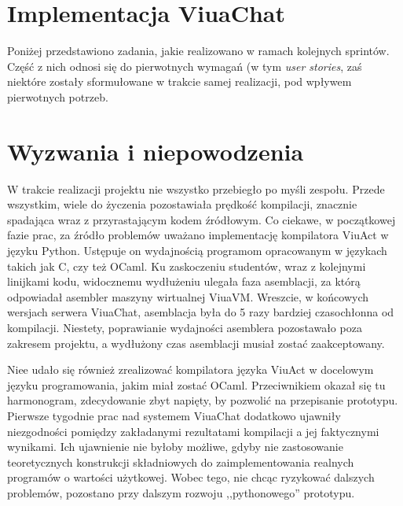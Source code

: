 \section{Implementacja ViuaChat}
 Poniżej przedstawiono zadania, jakie realizowano w ramach kolejnych
 sprintów. Część z nich odnosi się do pierwotnych wymagań (w tym
 \textit{user stories}, zaś niektóre zostały sformułowane w trakcie samej
 realizacji, pod wpływem pierwotnych potrzeb.















\section{Wyzwania i niepowodzenia}
W trakcie realizacji projektu nie wszystko przebiegło po myśli
zespołu. Przede wszystkim, wiele do życzenia pozostawiała prędkość kompilacji,
znacznie spadająca wraz z przyrastającym kodem źródłowym. Co ciekawe, w początkowej
fazie prac, za źródło problemów uważano implementację kompilatora ViuAct w języku Python.
Ustępuje on wydajnością programom opracowanym w językach takich jak C, czy też OCaml. Ku
zaskoczeniu studentów, wraz z kolejnymi linijkami kodu, widocznemu wydłużeniu
ulegała faza asemblacji, za którą odpowiadał asembler maszyny wirtualnej ViuaVM.
Wreszcie, w końcowych wersjach serwera ViuaChat, asemblacja była do 5 razy
bardziej czasochłonna od kompilacji. Niestety, poprawianie wydajności asemblera
pozostawało poza zakresem projektu, a wydłużony czas asemblacji musiał
zostać zaakceptowany.

Niee udało się również zrealizować kompilatora języka ViuAct w
docelowym języku programowania, jakim miał zostać OCaml. Przeciwnikiem okazał się tu
harmonogram, zdecydowanie zbyt napięty, by pozwolić na przepisanie prototypu.
Pierwsze tygodnie prac nad systemem ViuaChat dodatkowo ujawniły niezgodności 
pomiędzy zakładanymi rezultatami kompilacji a jej faktycznymi wynikami. Ich ujawnienie
nie byłoby możliwe, gdyby nie zastosowanie teoretycznych konstrukcji składniowych
do zaimplementowania realnych programów o wartości użytkowej. Wobec tego, nie chcąc
ryzykować dalszych problemów, pozostano przy dalszym rozwoju ,,pythonowego'' prototypu.
